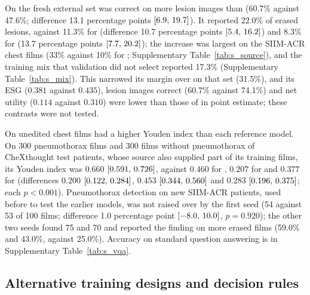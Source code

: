 On the fresh external set \msn{} was correct on more lesion images than \ms{} (60.7\% against 47.6\%; difference 13.1 percentage points $[6.9,\,19.7]$). It reported 22.0\% of erased lesions, against 11.3\% for \msp{} (difference 10.7 percentage points $[5.4,\,16.2]$) and 8.3\% for \ms{} (13.7 percentage points $[7.7,\,20.2]$); the increase was largest on the SIIM-ACR chest films (33\% against 10\% for \msp{}; Supplementary Table~\ref{tab:s_source}), and the training mix that validation did not select reported 17.3\% (Supplementary Table~\ref{tab:s_mix}). This narrowed its margin over \gem{} on that set (31.5\%), and its ESG ($0.381$ against $0.435$), lesion images correct (60.7\% against 74.1\%) and net utility ($0.114$ against $0.310$) were lower than those of \gem{} in point estimate; these contrasts were not tested.

On unedited chest films \msn{} had a higher Youden index than each reference model. On 300 pneumothorax films and 300 films without pneumothorax of CheXthought test patients, whose source also supplied part of its training films, its Youden index was $0.660$ $[0.591,\,0.726]$, against $0.460$ for \gem, $0.207$ for \opus{} and $0.377$ for \gpt{} (differences $0.200$ $[0.122,\,0.284]$, $0.453$ $[0.344,\,0.560]$ and $0.283$ $[0.196,\,0.375]$; each $p < 0.001$). Pneumothorax detection on new SIIM-ACR patients, used before to test the earlier models, was not raised over \msp{} by the first seed (54 against 53 of 100 films; difference 1.0 percentage point $[-8.0,\,10.0]$, $p = 0.920$); the other two seeds found 75 and 70 and reported the finding on more erased films (59.0\% and 43.0\%, against 25.0\%). Accuracy on standard question answering is in Supplementary Table~\ref{tab:s_vqa}.

\subsection{Alternative training designs and decision rules}
\label{subsec:res_designs}

